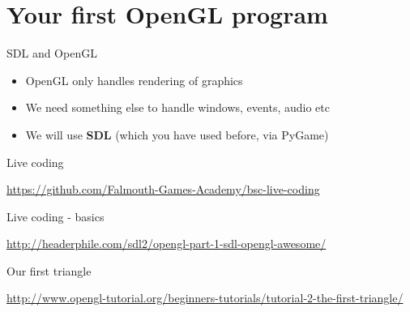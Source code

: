 \part{Your first OpenGL program}
\frame{\partpage}

\begin{frame}{SDL and OpenGL}
	\begin{itemize}
		\pause\item OpenGL only handles rendering of graphics
		\pause\item We need something else to handle windows, events, audio etc
		\pause\item We will use \textbf{SDL} (which you have used before, via PyGame)
	\end{itemize}
\end{frame}

\begin{frame}{Live coding}
	\begin{center}
		\url{https://github.com/Falmouth-Games-Academy/bsc-live-coding}
	\end{center}
\end{frame}

\begin{frame}{Live coding - basics}
	\begin{center}
		\url{http://headerphile.com/sdl2/opengl-part-1-sdl-opengl-awesome/}
	\end{center}
\end{frame}

\begin{frame}{Our first triangle}
	\begin{center}
		\url{http://www.opengl-tutorial.org/beginners-tutorials/tutorial-2-the-first-triangle/}
	\end{center}
\end{frame}

